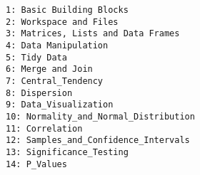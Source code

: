 \documentclass[12pt,article]{article}
\begin{document}
\large
\begin{verbatim}
1: Basic Building Blocks
2: Workspace and Files
3: Matrices, Lists and Data Frames
4: Data Manipulation
5: Tidy Data
6: Merge and Join
7: Central_Tendency
8: Dispersion
9: Data_Visualization
10: Normality_and_Normal_Distribution
11: Correlation
12: Samples_and_Confidence_Intervals
13: Significance_Testing
14: P_Values
\end{verbatim}
\end{document}
